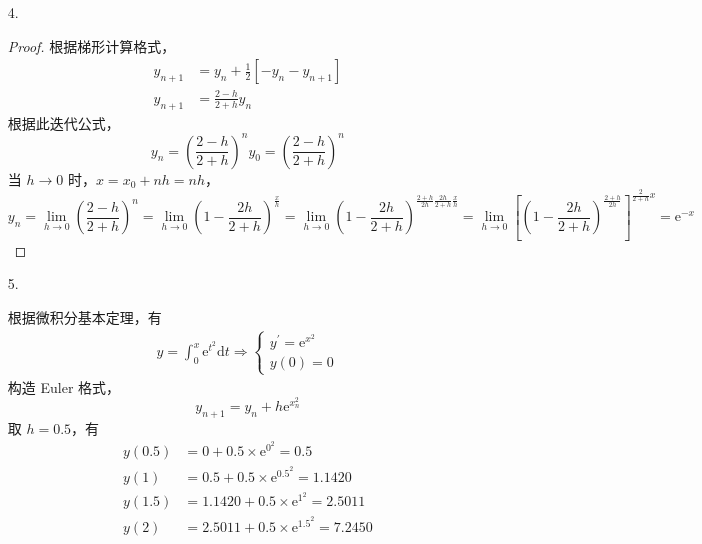 \documentclass{sjtuarticle}
\def\dd{\mathrm{d}}
\def\ee{\mathrm{e}}
\begin{document}
\begin{itemize}
    \item[4.] \begin{proof}
        根据梯形计算格式，
        \begin{align*}
            y_{n+1}&=y_n+\frac{1}{2}[-y_n-y_{n+1}] \\
            y_{n+1}&=\frac{2-h}{2+h}y_n
        \end{align*}
        根据此迭代公式，
        \begin{equation*}
            y_{n}=\left(\frac{2-h}{2+h}\right)^n y_0 = \left(\frac{2-h}{2+h}\right)^n
        \end{equation*}
        当 $h\rightarrow 0$ 时，$x=x_0+nh=nh$，
        \begin{equation*}
            y_{n}=\lim_{h\rightarrow 0}\left(\frac{2-h}{2+h}\right)^n =\lim_{h\rightarrow 0} \left(1-\frac{2h}{2+h}\right)^{\frac{x}{h}}
            =\lim_{h\rightarrow 0} \left(1-\frac{2h}{2+h}\right)^{\frac{2+h}{2h}\frac{2h}{2+h}\frac{x}{h}}=\lim_{h\rightarrow 0}\left[\left(1-\frac{2h}{2+h}\right)^{\frac{2+h}{2h}}\right]^{\frac{2}{2+h}x}=\ee^{-x}
        \end{equation*}
    \end{proof}

    \item[5.] \begin{solution}
        根据微积分基本定理，有
        \begin{align*}
            y=\int_0^x\ee^{t^2}\dd t \Rightarrow
            \begin{cases}
                y^\prime =\ee^{x^2}\\
                y(0)=0
            \end{cases}
        \end{align*}
        构造 Euler 格式，
        \begin{equation*}
            y_{n+1}=y_n + h\ee^{x_n^2}
        \end{equation*}
        取 $h=0.5$，有
        \begin{align*}
            y(0.5)&=0+0.5\times \ee^{0^2}=0.5\\
            y(1)&=0.5+0.5\times \ee^{0.5^2}=1.1420\\
            y(1.5)&=1.1420+0.5\times \ee^{1^2}=2.5011\\
            y(2)&=2.5011+0.5\times \ee^{1.5^2}=7.2450
        \end{align*}
    \end{solution}


\end{itemize}
\end{document}
